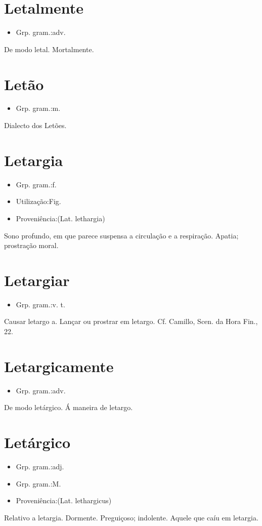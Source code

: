 \section{Letalmente}
\begin{itemize}
\item {Grp. gram.:adv.}
\end{itemize}
De modo letal.
Mortalmente.
\section{Letão}
\begin{itemize}
\item {Grp. gram.:m.}
\end{itemize}
Dialecto dos Letões.
\section{Letargia}
\begin{itemize}
\item {Grp. gram.:f.}
\end{itemize}
\begin{itemize}
\item {Utilização:Fig.}
\end{itemize}
\begin{itemize}
\item {Proveniência:(Lat. \textunderscore lethargia\textunderscore )}
\end{itemize}
Sono profundo, em que parece suspensa a circulação e a respiração.
Apatia; prostração moral.
\section{Letargiar}
\begin{itemize}
\item {Grp. gram.:v. t.}
\end{itemize}
Causar letargo a.
Lançar ou prostrar em letargo. Cf. Camillo, \textunderscore Scen. da Hora Fin.\textunderscore , 22.
\section{Letargicamente}
\begin{itemize}
\item {Grp. gram.:adv.}
\end{itemize}
De modo letárgico.
Á maneira de letargo.
\section{Letárgico}
\begin{itemize}
\item {Grp. gram.:adj.}
\end{itemize}
\begin{itemize}
\item {Grp. gram.:M.}
\end{itemize}
\begin{itemize}
\item {Proveniência:(Lat. \textunderscore lethargicus\textunderscore )}
\end{itemize}
Relativo a letargia.
Dormente.
Preguiçoso; indolente.
Aquele que caíu em letargia.
